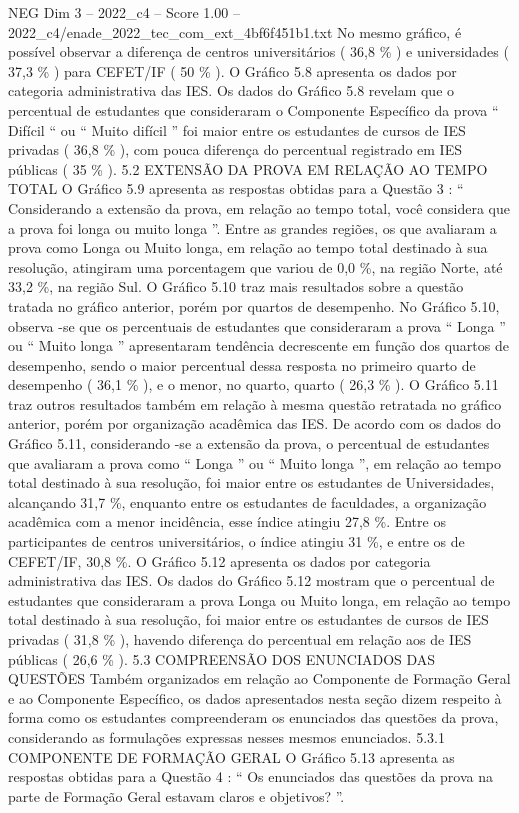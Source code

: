 \begin{textsample}{NEG Dim 3 – 2022\_c4 – Score 1.00 – 2022\_c4/enade\_2022\_tec\_com\_ext\_4bf6f451b1.txt}
No mesmo gráfico, é possível observar a diferença de centros universitários ( 36,8 \% ) e universidades ( 37,3 \% ) para CEFET/IF ( 50 \% ).
O Gráfico 5.8 apresenta os dados por categoria administrativa das IES.
Os dados do Gráfico 5.8 revelam que o percentual de estudantes que consideraram o Componente Específico da prova “ Difícil “ ou “ Muito difícil ” foi maior entre os estudantes de cursos de IES privadas ( 36,8 \% ), com pouca diferença do percentual registrado em IES públicas ( 35 \% ). 5.2 EXTENSÃO DA PROVA EM RELAÇÃO AO TEMPO TOTAL O Gráfico 5.9 apresenta as respostas obtidas para a Questão 3 : “ Considerando a extensão da prova, em relação ao tempo total, você considera que a prova foi longa ou muito longa ”.
Entre as grandes regiões, os que avaliaram a prova como Longa ou Muito longa, em relação ao tempo total destinado à sua resolução, atingiram uma porcentagem que variou de 0,0 \%, na região Norte, até 33,2 \%, na região Sul.
O Gráfico 5.10 traz mais resultados sobre a questão tratada no gráfico anterior, porém por quartos de desempenho.
No Gráfico 5.10, observa -se que os percentuais de estudantes que consideraram a prova “ Longa ” ou “ Muito longa ” apresentaram tendência decrescente em função dos quartos de desempenho, sendo o maior percentual dessa resposta no primeiro quarto de desempenho ( 36,1 \% ), e o menor, no quarto, quarto ( 26,3 \% ).
O Gráfico 5.11 traz outros resultados também em relação à mesma questão retratada no gráfico anterior, porém por organização acadêmica das IES.
De acordo com os dados do Gráfico 5.11, considerando -se a extensão da prova, o percentual de estudantes que avaliaram a prova como “ Longa ” ou “ Muito longa ”, em relação ao tempo total destinado à sua resolução, foi maior entre os estudantes de Universidades, alcançando 31,7 \%, enquanto entre os estudantes de faculdades, a organização acadêmica com a menor incidência, esse índice atingiu 27,8 \%.
Entre os participantes de centros universitários, o índice atingiu 31 \%, e entre os de CEFET/IF, 30,8 \%.
O Gráfico 5.12 apresenta os dados por categoria administrativa das IES.
Os dados do Gráfico 5.12 mostram que o percentual de estudantes que consideraram a prova Longa ou Muito longa, em relação ao tempo total destinado à sua resolução, foi maior entre os estudantes de cursos de IES privadas ( 31,8 \% ), havendo diferença do percentual em relação aos de IES públicas ( 26,6 \% ). 5.3 COMPREENSÃO DOS ENUNCIADOS DAS QUESTÕES Também organizados em relação ao Componente de Formação Geral e ao Componente Específico, os dados apresentados nesta seção dizem respeito à forma como os estudantes compreenderam os enunciados das questões da prova, considerando as formulações expressas nesses mesmos enunciados. 5.3.1 COMPONENTE DE FORMAÇÃO GERAL O Gráfico 5.13 apresenta as respostas obtidas para a Questão 4 : “ Os enunciados das questões da prova na parte de Formação Geral estavam claros e objetivos? ”.

\end{textsample}
